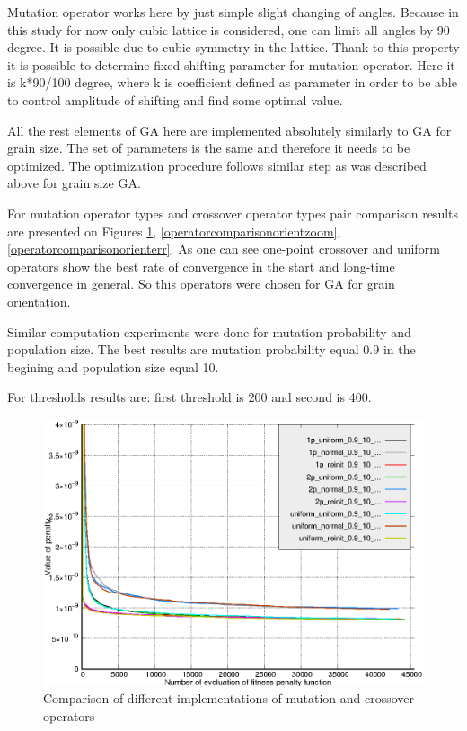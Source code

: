 \documentclass[12pt]{report}
\begin{document}
Mutation operator works here by just simple slight changing of angles. Because in this study for now only cubic lattice is considered, one can limit all angles by 90 degree. It is possible due to cubic symmetry in the lattice. Thank to this property it is possible to determine fixed shifting parameter for mutation operator. Here it is k*90/100 degree, where k is coefficient defined as parameter in order to be able to control amplitude of shifting and find some optimal value.

All the rest elements of GA here are implemented absolutely similarly to GA for grain size. The set of parameters is the same and therefore it needs to be optimized. The optimization procedure follows similar step as was described above for grain size GA.

For mutation operator types and crossover operator types pair comparison results are presented on Figures \ref{operatorcomparisonorient}, \ref{operatorcomparisonorientzoom},\ref{operatorcomparisonorienterr}. As one can see one-point crossover and uniform operators show the best rate of convergence in the start and long-time convergence in general. So this operators were chosen for GA for grain orientation.

Similar computation experiments were done for mutation probability and population size. The best results are mutation probability equal 0.9 in the begining and population size equal 10.

For thresholds results are: first threshold is 200 and second is 400.

\begin{figure}
    \centering
    \includegraphics[width=5.0in]{operators_comparison_orient}
    \caption{Comparison of different implementations of mutation and crossover operators}
    \label{operatorcomparisonorient}
\end{figure}
\end{document}
